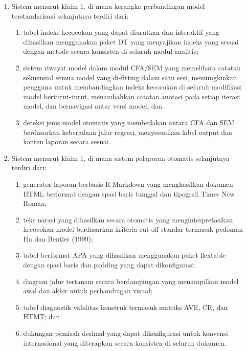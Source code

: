 \documentclass[12pt,a4paper]{article}
\begin{document}
\begin{enumerate}[leftmargin=3em, labelsep=1em, itemsep=12pt]
\item Sistem menurut klaim 1, di mana kerangka perbandingan model terstandarisasi selanjutnya terdiri dari:
\begin{enumerate}[label=\alph*., leftmargin=2em, itemsep=2pt]
\item tabel indeks kecocokan yang dapat diurutkan dan interaktif yang dihasilkan menggunakan paket DT yang menyajikan indeks yang sesuai dengan metode secara konsisten di seluruh modul analitis;
\item sistem riwayat model dalam modul CFA/SEM yang memelihara catatan sekuensial semua model yang di-fitting dalam satu sesi, memungkinkan pengguna untuk membandingkan indeks kecocokan di seluruh modifikasi model berturut-turut, menambahkan catatan anotasi pada setiap iterasi model, dan bernavigasi antar versi model; dan
\item deteksi jenis model otomatis yang membedakan antara CFA dan SEM berdasarkan keberadaan jalur regresi, menyesuaikan label output dan konten laporan secara sesuai.
\end{enumerate}

\item Sistem menurut klaim 1, di mana sistem pelaporan otomatis selanjutnya terdiri dari:
\begin{enumerate}[label=\alph*., leftmargin=2em, itemsep=2pt]
\item generator laporan berbasis R Markdown yang menghasilkan dokumen HTML berformat dengan spasi baris tunggal dan tipografi Times New Roman;
\item teks narasi yang dihasilkan secara otomatis yang menginterpretasikan kecocokan model berdasarkan kriteria cut-off standar termasuk pedoman Hu dan Bentler (1999);
\item tabel berformat APA yang dihasilkan menggunakan paket flextable dengan spasi baris dan padding yang dapat dikonfigurasi;
\item diagram jalur tertanam secara berdampingan yang menampilkan model awal dan akhir untuk perbandingan visual;
\item tabel diagnostik validitas konstruk termasuk matriks AVE, CR, dan HTMT; dan
\item dukungan pemisah desimal yang dapat dikonfigurasi untuk konvensi internasional yang diterapkan secara konsisten di seluruh dokumen.
\end{enumerate}


\end{enumerate}
\end{document}
